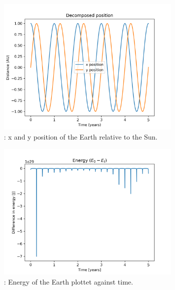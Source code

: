 \documentclass{article}
\begin{document}
    \begin{figure}[H]
        \begin{center}
            \includegraphics[width=0.8\textwidth]{./Plot/xy_vs_time.png}
            \caption{: x and y position of the Earth relative to the Sun.}
            \label{fig:position}
        \end{center}
    \end{figure}

    \begin{figure}[H]
        \begin{center}
            \includegraphics[width=0.8\textwidth]{./Plot/energy.png}
            \caption{: Energy of the Earth plottet against time.
            }
            \label{fig:energy}
        \end{center}
    \end{figure}
\end{document}

